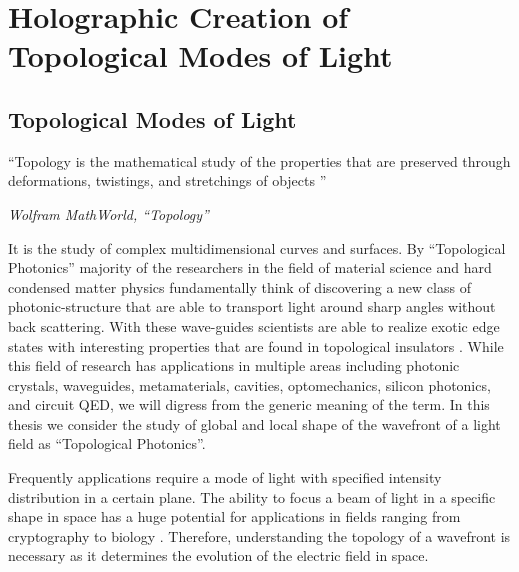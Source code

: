 \chapter{Holographic Creation of Topological Modes of Light}
\label{ch:topological_modes}

\section{Topological Modes of Light}

\setlength{\epigraphwidth}{0.8\textwidth}
\epigraph{``Topology is the mathematical study of the properties that are preserved through deformations, twistings, and stretchings of objects \cite{topology}''}{\textit{Wolfram MathWorld, ``Topology''}}

It is the study of complex multidimensional curves and surfaces. By ``Topological Photonics'' \cite{leykam2016, Zhou_2017} majority of the researchers in the field of material science and hard condensed matter physics fundamentally think of discovering a new class of photonic-structure \cite{Barik666} that are able to transport light around sharp angles without back scattering. With these wave-guides scientists are able to realize exotic edge states with interesting properties that are found  in topological insulators \cite{hsieh2008, haldane20107}. While this field of research has applications in multiple areas \cite{ozawa2019} including photonic crystals, waveguides, metamaterials, cavities, optomechanics, silicon photonics, and circuit QED, we will digress from the generic meaning of the term. In this thesis we consider the study of global and local shape of the wavefront of a light field as ``Topological Photonics''. 

Frequently applications require a mode of light with specified intensity distribution in a certain plane. The ability to focus a beam of light in a specific shape in space has a huge potential for applications in fields ranging from cryptography \cite{Horstmeyer2013, Horstmeyer2013cleo} to biology \cite{wang2012, Papadopoulos:12}. Therefore, understanding the topology of a wavefront is necessary as it determines the evolution of the electric field in space. 

